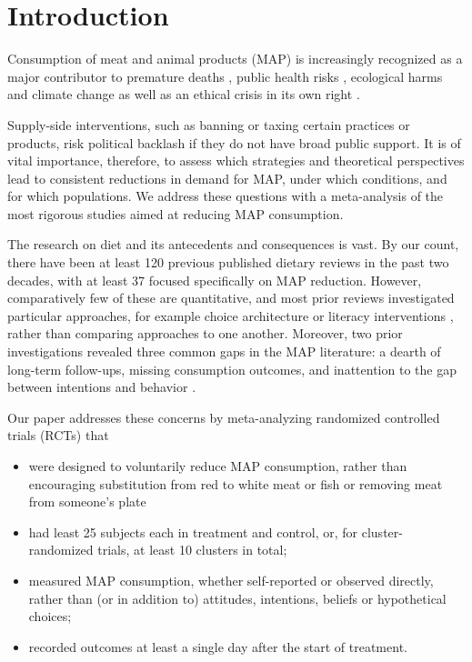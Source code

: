 \documentclass[sn-nature,pdflatex]{sn-jnl}
\begin{document}
\maketitle

\section{Introduction}\label{sec1}

Consumption of meat and animal products (MAP) is increasingly recognized
as a major contributor to premature deaths
\citep{willett2019, landry2023}, public health risks
\citep{slingenbergh2004, graham2008}, ecological harms
\citep{greger2010} and climate change
\citep{scarborough2023, koneswaran2008} as well as an ethical crisis in
its own right \citep{kuruc2023, singer2023}.

Supply-side interventions, such as banning or taxing certain practices
or products, risk political backlash if they do not have broad public
support. It is of vital importance, therefore, to assess which
strategies and theoretical perspectives lead to consistent reductions in
demand for MAP, under which conditions, and for which populations. We
address these questions with a meta-analysis of the most rigorous
studies aimed at reducing MAP consumption.

The research on diet and its antecedents and consequences is vast. By
our count, there have been at least 120 previous published dietary
reviews in the past two decades, with at least 37 focused specifically
on MAP reduction. However, comparatively few of these are quantitative,
and most prior reviews investigated particular approaches, for example
choice architecture \citep{bianchi2018restructuring} or literacy
interventions \citep{DiGennaro2024}, rather than comparing approaches to
one another. Moreover, two prior investigations revealed three common
gaps in the MAP literature: a dearth of long-term follow-ups, missing
consumption outcomes, and inattention to the gap between intentions and
behavior \citep{mathur2021meta, mathur2021effectiveness}.

Our paper addresses these concerns by meta-analyzing randomized
controlled trials (RCTs) that

\begin{itemize}
\item
  were designed to voluntarily reduce MAP consumption, rather than
  encouraging substitution from red to white meat or fish or removing
  meat from someone's plate
\item
  had least 25 subjects each in treatment and control, or, for
  cluster-randomized trials, at least 10 clusters in total;
\item
  measured MAP consumption, whether self-reported or observed directly,
  rather than (or in addition to) attitudes, intentions, beliefs or
  hypothetical choices;
\item
  recorded outcomes at least a single day after the start of treatment.
\end{itemize}
\end{document}
